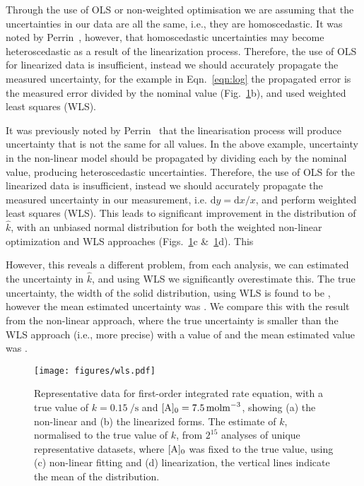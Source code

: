 \documentclass[journal=jceda8,manuscript=article]{achemso}
\begin{document}
Through the use of OLS or non-weighted optimisation we are assuming that the uncertainties in our data are all the same, i.e., they are homoscedastic. 
It was noted by Perrin~\cite{perrin_linear_2017}, however, that homoscedastic uncertainties may become heteroscedastic as a result of the linearization process. 
Therefore, the use of OLS for linearized data is insufficient, instead we should accurately propagate the measured uncertainty, for the example in Eqn.~\ref{eqn:log} the propagated error is the measured error divided by the nominal value (Fig.~\ref{fig:wls}b), and used weighted least squares (WLS).

It was previously noted by Perrin~\cite{perrin_linear_2017} that the linearisation process will produce uncertainty that is not the same for all values. 
In the above example, uncertainty in the non-linear model should be propagated by dividing each by the nominal value, producing heteroscedastic uncertainties. 
Therefore, the use of OLS for the linearized data is insufficient, instead we should accurately propagate the measured uncertainty in our measurement, i.e. $\mathrm{d}y = \mathrm{d}x / x$, and perform weighted least squares (WLS). 
This leads to significant improvement in the distribution of $\hat{k}$, with an unbiased normal distribution for both the weighted non-linear optimization and WLS approaches (Figs.~\ref{fig:wls}c \&~\ref{fig:wls}d).
This 


However, this reveals a different problem, from each analysis, we can estimated the uncertainty in $\hat{k}$, and using WLS we significantly overestimate this. 
The true uncertainty, the width of the solid distribution, using WLS is found to be , however the mean estimated uncertainty was . 
We compare this with the result from the non-linear approach, where the true uncertainty is smaller than the WLS approach (i.e., more precise) with a value of  and the mean estimated value was .
%
\begin{figure}
  \texttt{[image: figures/wls.pdf]}
  \caption{
    Representative data for first-order integrated rate equation, with a true value of $k=\SI{0.15}{\per\second}$ and $[\ce{A}]_0=\SI{7.5}{\mol\m^{-3}}$, showing (a) the non-linear and (b) the linearized forms. 
    The estimate of $k$, normalised to the true value of $k$, from $2^{15}$ analyses of unique representative datasets, where $[\ce{A}]_0$ was fixed to the true value, using (c) non-linear fitting and (d) linearization, the vertical lines indicate the mean of the distribution. 
    }
  \label{fig:wls}
\end{figure}
%
\end{document}
